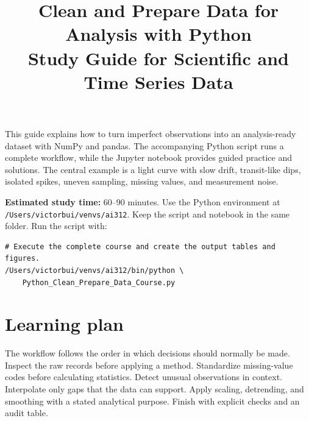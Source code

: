 \documentclass[11pt,letterpaper]{article}
\title{Clean and Prepare Data for Analysis with Python\\[0.35em]
\large Study Guide for Scientific and Time Series Data}
\author{}
\date{}
\begin{document}
\maketitle
\vspace{-2em}

This guide explains how to turn imperfect observations into an analysis-ready
dataset with NumPy and pandas. The accompanying Python script runs a complete
workflow, while the Jupyter notebook provides guided practice and solutions.
The central example is a light curve with slow drift, transit-like dips,
isolated spikes, uneven sampling, missing values, and measurement noise.

\textbf{Estimated study time:} 60--90 minutes. Use the Python environment at
\nolinkurl{/Users/victorbui/venvs/ai312}. Keep the script and notebook in the same
folder. Run the script with:

\begin{lstlisting}
# Execute the complete course and create the output tables and figures.
/Users/victorbui/venvs/ai312/bin/python \
    Python_Clean_Prepare_Data_Course.py
\end{lstlisting}

\tableofcontents

\section{Learning plan}

The workflow follows the order in which decisions should normally be made.
Inspect the raw records before applying a method. Standardize missing-value
codes before calculating statistics. Detect unusual observations in context.
Interpolate only gaps that the data can support. Apply scaling, detrending, and
smoothing with a stated analytical purpose. Finish with explicit checks and an
audit table.
\end{document}
